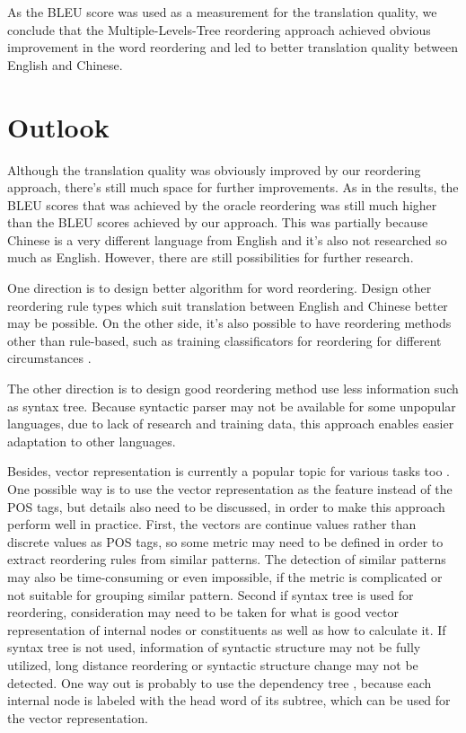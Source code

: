 As the \ac{BLEU} score was used as a measurement for the translation quality, we conclude that the Multiple-Levels-Tree reordering approach achieved obvious improvement in the word reordering and led to better translation quality between English and Chinese.

\section{Outlook}
\label{ch:Discussion:sec:Outlook}

Although the translation quality was obviously improved by our reordering approach, there's still much space for further improvements. As in the results, the \ac{BLEU} scores that was achieved by the oracle reordering was still much higher than the \ac{BLEU} scores achieved by our approach. This was partially because Chinese is a very different language from English and it's also not researched so much as English. However, there are still possibilities for further research.

One direction is to design better algorithm for word reordering. Design other reordering rule types which suit translation between English and Chinese better may be possible. On the other side, it's also possible to have reordering methods other than rule-based, such as training classificators for reordering for different circumstances \citep{google}.

The other direction is to design good reordering method use less information such as syntax tree. Because syntactic parser may not be available for some unpopular languages, due to lack of research and training data, this approach enables easier adaptation to other languages.

Besides, vector representation is currently a popular topic for various tasks too \citep{oxford, Mikolov}. One possible way is to use the vector representation as the feature instead of the \ac{POS} tags, but details also need to be discussed, in order to make this approach perform well in practice. First, the vectors are continue values rather than discrete values as \ac{POS} tags, so some metric may need to be defined in order to extract reordering rules from similar patterns. The detection of similar patterns may also be time-consuming or even impossible, if the metric is complicated or not suitable for grouping similar pattern. Second if syntax tree is used for reordering, consideration may need to be taken for what is good vector representation of internal nodes or constituents as well as how to calculate it. If syntax tree is not used, information of syntactic structure may not be fully utilized, long distance reordering or syntactic structure change may not be detected. One way out is probably to use the dependency tree \citep{depend}, because each internal node is labeled with the head word of its subtree, which can be used for the vector representation. 

